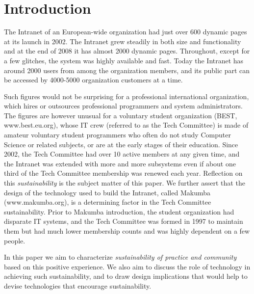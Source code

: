 \documentclass{sig-alt-release2}
\begin{document}


\section{Introduction}\label{sec:introduction}
The Intranet of an European-wide organization had just over 600 dynamic pages at its launch in 2002. The Intranet grew steadily in both size and functionality and at the end of 2008 it has almost 2000 dynamic pages. Throughout, except for a few glitches, the system was highly available and fast. Today the Intranet has around 2000 users from among the organization members, and its public part can be accessed by 4000-5000 organization customers at a time.

Such figures would not be surprising for a professional international organization, which hires or outsources professional programmers and system administrators. 
The figures are however unusual for a voluntary student organization (BEST, www.best.eu.org), whose IT crew (referred to as the Tech Committee) is made of amateur voluntary student programmers who often do not study Computer Science or related subjects, or are at the early stages of their education.  
Since 2002, the Tech Committee had over 10 active members at any given time, and the Intranet was extended with more and more subsystems even if about one third of the Tech Committee membership was renewed each year. Reflection on this {\it sustainability} is the subject matter of this paper. We further assert that the design of the technology used to build the Intranet, called Makumba (www.makumba.org), is a determining factor in the Tech Committee sustainability.
Prior to Makumba introduction, the student organization had disparate IT systems, and the Tech Committee was formed in 1997 to maintain them but had much lower membership counts and was highly dependent on a few people.

In this paper we aim to characterize {\it sustainability of practice and community} based on this positive experience. We also aim to discuss the role of technology in achieving such sustainability, and to draw design implications that would help to devise technologies that encourage sustainability. 
\end{document}
